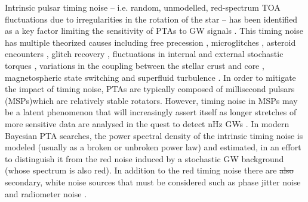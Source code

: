 \documentclass[fleqn,usenatbib,useAMS]{mnras}
\providecommand{\DIFadd}[1]{{\protect\color{blue}\uwave{#1}}} %
\providecommand{\DIFdel}[1]{{\protect\color{red}\sout{#1}}}                      %
\providecommand{\DIFaddbegin}{} %
\providecommand{\DIFaddend}{} %
\providecommand{\DIFdelbegin}{} %
\providecommand{\DIFdelend}{} %
\newcommand{\DIFscaledelfig}{0.5}
\newlength{\DIFdelgraphicswidth} %
\newlength{\DIFdelgraphicsheight} %
\newcommand{\DIFaddincludegraphics}[2][]{{\color{blue}\fbox{\DIFOincludegraphics[#1]{#2}}}} %
\newcommand{\DIFdelincludegraphics}[2][]{%
\sbox{\DIFdelgraphicsbox}{\DIFOincludegraphics[#1]{#2}}%
\settoboxwidth{\DIFdelgraphicswidth}{\DIFdelgraphicsbox} %
\settoboxtotalheight{\DIFdelgraphicsheight}{\DIFdelgraphicsbox} %
\scalebox{\DIFscaledelfig}{%
\parbox[b]{\DIFdelgraphicswidth}{\usebox{\DIFdelgraphicsbox}\\[-\baselineskip] \rule{\DIFdelgraphicswidth}{0em}}\llap{\resizebox{\DIFdelgraphicswidth}{\DIFdelgraphicsheight}{%
\setlength{\unitlength}{\DIFdelgraphicswidth}%
\begin{picture}(1,1)%
\thicklines\linethickness{2pt} %
{\color[rgb]{1,0,0}\put(0,0){\framebox(1,1){}}}%
{\color[rgb]{1,0,0}\put(0,0){\line( 1,1){1}}}%
{\color[rgb]{1,0,0}\put(0,1){\line(1,-1){1}}}%
\end{picture}%
}\hspace*{3pt}}} %
} %
\DeclareRobustCommand{\DIFaddbegin}{\DIFOaddbegin \let\includegraphics\DIFaddincludegraphics} %
\DeclareRobustCommand{\DIFaddend}{\DIFOaddend \let\includegraphics\DIFOincludegraphics} %
\DeclareRobustCommand{\DIFdelbegin}{\DIFOdelbegin \let\includegraphics\DIFdelincludegraphics} %
\DeclareRobustCommand{\DIFdelend}{\DIFOaddend \let\includegraphics\DIFOincludegraphics} %
\begin{document}
Intrinsic pulsar timing noise -- i.e.  random, unmodelled, red-spectrum TOA fluctuations due to irregularities in the rotation of the star -- has been identified as a key factor limiting the sensitivity of PTAs to GW signals \citep{Shannon2010,Lasky2015,Caballero2016,Goncharov2021}. This timing noise has multiple theorized causes including free precession \citep{free_precession_kerr,stairs_freeprecession}, microglitches \citep{Alessandro1995,Melatos2008,Espinoza2021}, asteroid encounters \citep{Shannon_2013,Brook_2014}, glitch recovery \citep{Johnston10,Hobbs2010glitch}, fluctuations in internal and external stochastic torques \citep{Cordes1981, 2006MNRAS.370L..76U,Antonelli2023}, variations in the coupling between the stellar crust and core \citep{Jones1990MNRAS.246..364J,Meyers2021,Melatos2023}, magnetospheric state switching \citep{magneto1,Lyne2010L,Stairs2019MNRAS.485.3230S} and superfluid turbulence \citep{Greenstein1970,Peralta2006,Melatos2014}. In order to mitigate the impact of timing noise, PTAs are typically composed of millisecond pulsars (MSPs)\DIFaddbegin \DIFadd{, }\DIFaddend which are relatively stable rotators. However, timing noise in MSPs may be a latent phenomenon that will increasingly assert itself as longer stretches of more sensitive data are analysed in the quest to detect nHz GWs \citep{Shannon2010}. In modern Bayesian PTA searches, the power spectral density of the intrinsic timing noise is modeled (usually as a broken or unbroken power law) and estimated, in an effort to distinguish it from the red noise induced by a stochastic GW background (whose spectrum is also red). In addition to the red timing noise there are \DIFdelbegin \DIFdel{also }\DIFdelend secondary, white noise sources that must be considered such as phase jitter noise and radiometer noise \citep{Cordes2010,Lam2019,Parthasarathy2021}. \newline 
\end{document}
